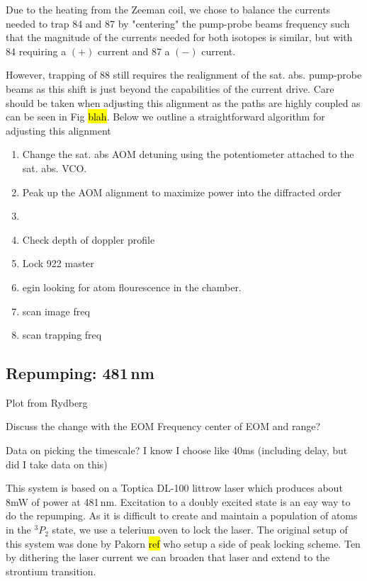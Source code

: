Due to the heating from the Zeeman coil, we chose to balance the currents needed to trap 84 and 87 by "centering" the pump-probe beams frequency such that the magnitude of the currents needed for both isotopes is similar, but with 84 requiring a $(+)$ current and 87 a $(-)$ current.

However, trapping of 88 still requires the realignment of the sat. abs. pump-probe beams as this shift is just beyond the capabilities of the current drive. 
Care should be taken when adjusting this alignment as the paths are highly coupled as can be seen in Fig \hl{blah}. 
Below we outline a straightforward algorithm for adjusting this alignment
\begin{enumerate}[nolistsep]
\item Change the sat. abs AOM detuning using the potentiometer attached to the sat. abs. VCO. 
\item Peak up the AOM alignment to maximize power into the diffracted order
\item
\item Check depth of doppler profile
\item Lock 922 master
\item egin looking for atom flourescence in the chamber.
\item scan image freq
\item scan trapping freq
\end{enumerate}
		



\subsection{Repumping: 481\,nm}
\label{ssec:481sys}

Plot from Rydberg

Discuss the change with the EOM
	Frequency center of EOM and range?
	
Data on picking the timescale?
	I know I choose like 40ms (including delay, but did I take data on this)

This system is based on a Toptica DL-100 littrow laser which produces about 8mW of power at 481\,nm. 
Excitation to a doubly excited state is an eay way to do the repumping.
As it is difficult to create and maintain a population of atoms in the $^3P_2$ state, we use a telerium oven to lock the laser.
The original setup of this system was done by Pakorn \hl{ref} who setup a side of peak locking scheme. 
Ten by dithering the laser current we can broaden that laser and extend to the strontium transition.


